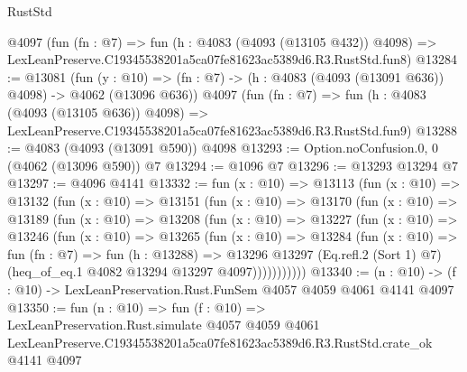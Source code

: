 \begin{lexlean}{RustStd}
\begin{coremodule}
    @4097
    (fun (fn : @7) =>
    fun (h : @4083 (@4093 (@13105 @432)) @4098) =>
    LexLeanPreserve.C19345538201a5ca07fe81623ac5389d6.R3.RustStd.fun8)
@13284 := @13081
    (fun (y : @10) => (fn : @7) -> (h : @4083 (@4093 (@13091 @636)) @4098) -> @4062 (@13096 @636))
    @4097
    (fun (fn : @7) =>
    fun (h : @4083 (@4093 (@13105 @636)) @4098) =>
    LexLeanPreserve.C19345538201a5ca07fe81623ac5389d6.R3.RustStd.fun9)
@13288 := @4083 (@4093 (@13091 @590)) @4098
@13293 := Option.noConfusion.{0, 0} (@4062 (@13096 @590)) @7
@13294 := @1096 @7
@13296 := @13293 @13294 @7
@13297 := @4096 @4141
@13332 := fun (x : @10) =>
  @13113
    (fun (x : @10) =>
    @13132
      (fun (x : @10) =>
      @13151
        (fun (x : @10) =>
        @13170
          (fun (x : @10) =>
          @13189
            (fun (x : @10) =>
            @13208
              (fun (x : @10) =>
              @13227
                (fun (x : @10) =>
                @13246
                  (fun (x : @10) =>
                  @13265
                    (fun (x : @10) =>
                    @13284
                      (fun (x : @10) =>
                      fun (fn : @7) =>
                      fun (h : @13288) =>
                      @13296
                        @13297
                        (Eq.refl.{2} (Sort 1) @7)
                        (heq_of_eq.{1} @4082 @13294 @13297 @4097)))))))))))
@13340 := (n : @10) -> (f : @10) -> LexLeanPreservation.Rust.FunSem @4057 @4059 @4061 @4141 @4097
@13350 := fun (n : @10) =>
  fun (f : @10) =>
  LexLeanPreservation.Rust.simulate
    @4057
    @4059
    @4061
    LexLeanPreserve.C19345538201a5ca07fe81623ac5389d6.R3.RustStd.crate_ok
    @4141
    @4097
\end{coremodule}
\end{lexlean}
